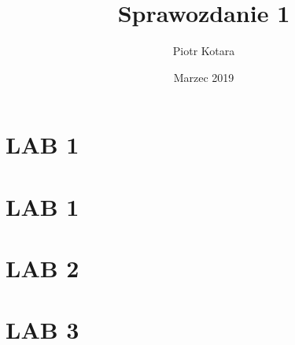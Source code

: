 \documentclass{report}
\title{Sprawozdanie 1}
\author{Piotr Kotara}
\date{Marzec 2019}
\begin{document}
\maketitle

\chapter{LAB 1}




\chapter{LAB 1}



\chapter{LAB 2}



\chapter{LAB 3}


\end{document}
